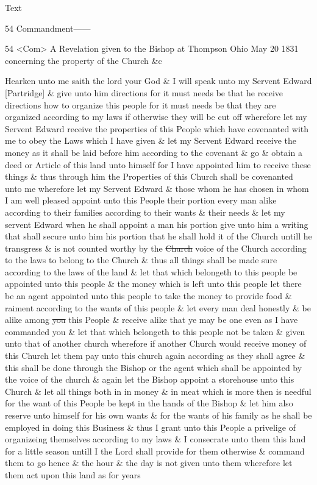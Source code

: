 			\begin{description}
				\item[Text]
			\end{description}
			
				\begin{tightcenter}
				54 Commandment------
				\end{tightcenter}
				
				54 <Com> A Revelation given to the Bishop at Thompson Ohio May 20 1831 concerning the property of the Church \&c
				
				Hearken unto me saith the lord your God \& I will speak unto my Servent Edward [Partridge] \& give unto him directions for it must needs be that he receive directions how to organize this people for it must needs be that they are organized according to my laws if otherwise they will be cut off wherefore let my Servent Edward receive the properties of this People which have covenanted with me to obey the Laws which I have given \& let my Servent Edward receive the money as it shall be laid before him according to the covenant \& go \& obtain a deed or Article of this land unto himself for I have appointed him to receive these things \& thus through him the Properties of this Church shall be covenanted unto me wherefore let my Servent Edward \& those whom he has chosen in whom I am well pleased appoint unto this People their portion every man alike according to their families according to their wants \& their needs \& let my servent Edward when he shall appoint a man his portion give unto him a writing that shall secure unto him his portion that he shall hold it of the Church untill he transgress \& is not counted worthy by the \sout{Church} voice of the Church according to the laws to belong to the Church \& thus all things shall be made sure according to the laws of the land \& let that which belongeth to this people be appointed unto this people \& the money which is left unto this people let there be an agent appointed unto this people to take the money to provide food \& raiment according to the wants of this people \& let every man deal honestly \& be alike among \sout{you} this People \& receive alike that ye may be one even as I have commanded you \& let that which belongeth to this people not be taken \& given unto that of another church wherefore if another Church would receive money of this Church let them pay unto this church again according as they shall agree \& this shall be done through the Bishop or the agent which shall be appointed by the voice of the church \& again let the Bishop appoint a storehouse unto this Church \& let all things both in in money \& in meat which is more then is needful for the want of this People be kept in the hands of the Bishop \& let him also reserve unto himself for his own wants \& for the wants of his family as he shall be employed in doing this Business \& thus I grant unto this People a privelige of organizeing themselves according to my laws \& I consecrate unto them this land for a little season untill I the Lord shall provide for them otherwise \& command them to go hence \& the hour \& the day is not given unto them wherefore let them act upon this land as for years 
